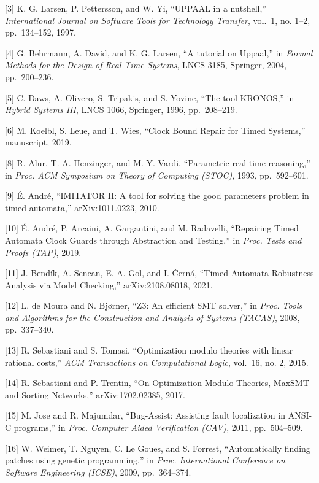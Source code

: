 \documentclass[
]{article}
\begin{document}
{[}3{]} K. G. Larsen, P. Pettersson, and W. Yi, ``UPPAAL in a
nutshell,'' \emph{International Journal on Software Tools for Technology
Transfer}, vol.~1, no. 1--2, pp.~134--152, 1997.

{[}4{]} G. Behrmann, A. David, and K. G. Larsen, ``A tutorial on
Uppaal,'' in \emph{Formal Methods for the Design of Real-Time Systems},
LNCS 3185, Springer, 2004, pp.~200--236.

{[}5{]} C. Daws, A. Olivero, S. Tripakis, and S. Yovine, ``The tool
KRONOS,'' in \emph{Hybrid Systems III}, LNCS 1066, Springer, 1996,
pp.~208--219.

{[}6{]} M. Koelbl, S. Leue, and T. Wies, ``Clock Bound Repair for Timed
Systems,'' manuscript, 2019.

{[}8{]} R. Alur, T. A. Henzinger, and M. Y. Vardi, ``Parametric
real-time reasoning,'' in \emph{Proc. ACM Symposium on Theory of
Computing (STOC)}, 1993, pp.~592--601.

{[}9{]} É. André, ``IMITATOR II: A tool for solving the good parameters
problem in timed automata,'' arXiv:1011.0223, 2010.

{[}10{]} É. André, P. Arcaini, A. Gargantini, and M. Radavelli,
``Repairing Timed Automata Clock Guards through Abstraction and
Testing,'' in \emph{Proc. Tests and Proofs (TAP)}, 2019.

{[}11{]} J. Bendík, A. Sencan, E. A. Gol, and I. Černá, ``Timed Automata
Robustness Analysis via Model Checking,'' arXiv:2108.08018, 2021.

{[}12{]} L. de Moura and N. Bjørner, ``Z3: An efficient SMT solver,'' in
\emph{Proc. Tools and Algorithms for the Construction and Analysis of
Systems (TACAS)}, 2008, pp.~337--340.

{[}13{]} R. Sebastiani and S. Tomasi, ``Optimization modulo theories
with linear rational costs,'' \emph{ACM Transactions on Computational
Logic}, vol.~16, no. 2, 2015.

{[}14{]} R. Sebastiani and P. Trentin, ``On Optimization Modulo
Theories, MaxSMT and Sorting Networks,'' arXiv:1702.02385, 2017.

{[}15{]} M. Jose and R. Majumdar, ``Bug-Assist: Assisting fault
localization in ANSI-C programs,'' in \emph{Proc. Computer Aided
Verification (CAV)}, 2011, pp.~504--509.

{[}16{]} W. Weimer, T. Nguyen, C. Le Goues, and S. Forrest,
``Automatically finding patches using genetic programming,'' in
\emph{Proc. International Conference on Software Engineering (ICSE)},
2009, pp.~364--374.
\end{document}
